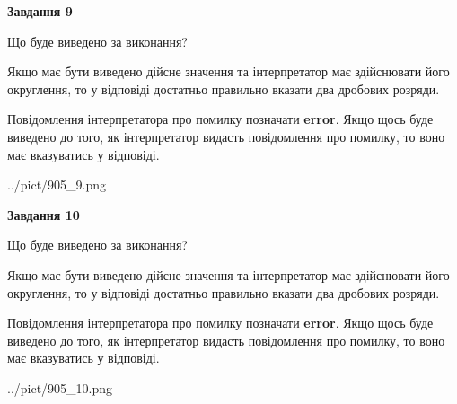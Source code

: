 \documentclass[12pt, ukrainian]{article}
\begin{document}
{\begin {Large}
{\begin {center}\textbf{Завдання 9}\end {center}}\par
Що буде виведено за виконання? \par

Якщо має бути виведено дійсне значення та інтерпретатор має здійснювати його округлення, 
то у відповіді достатньо правильно вказати два дробових розряди.

Повідомлення інтерпретатора про помилку позначати \textbf{error}.
Якщо щось буде виведено до того, як інтерпретатор видасть повідомлення про помилку, 
то воно має вказуватись у відповіді. \par

\begin{center}
	{../pict/905_9.png}
\end{center}
\newpage

{\begin {center}\textbf{Завдання 10}\end {center}}\par
Що буде виведено за виконання? \par

Якщо має бути виведено дійсне значення та інтерпретатор має здійснювати його округлення, 
то у відповіді достатньо правильно вказати два дробових розряди.

Повідомлення інтерпретатора про помилку позначати \textbf{error}.
Якщо щось буде виведено до того, як інтерпретатор видасть повідомлення про помилку, 
то воно має вказуватись у відповіді. \par

\begin{center}
	{../pict/905_10.png}
\end{center}
\newpage

\end {Large}}
\end{document}
